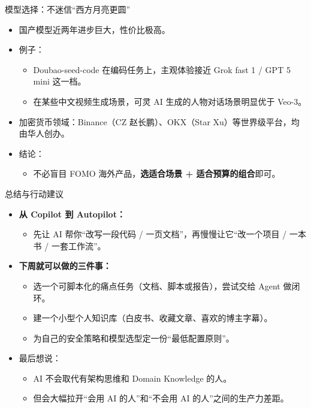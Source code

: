 \documentclass[aspectratio=169]{beamer}
\begin{document}
\begin{frame}{模型选择：不迷信“西方月亮更圆”}
  \begin{itemize}
    \item 国产模型近两年进步巨大，性价比极高。
    \item 例子：
      \begin{itemize}
        \item Doubao-seed-code 在编码任务上，主观体验接近 Grok fast 1 / GPT 5 mini 这一档。
        \item 在某些中文视频生成场景，可灵 AI 生成的人物对话场景明显优于 Veo-3。
      \end{itemize}
    \item 加密货币领域：Binance（CZ 赵长鹏）、OKX（Star Xu）等世界级平台，均由华人创办。
    \item 结论：
      \begin{itemize}
        \item 不必盲目 FOMO 海外产品，\textbf{选适合场景 + 适合预算的组合}即可。
      \end{itemize}
  \end{itemize}
\end{frame}

\begin{frame}{总结与行动建议}
  \begin{itemize}
    \item \textbf{从 Copilot 到 Autopilot：}
      \begin{itemize}
        \item 先让 AI 帮你“改写一段代码 / 一页文档”，再慢慢让它“改一个项目 / 一本书 / 一套工作流”。
      \end{itemize}
    \item \textbf{下周就可以做的三件事：}
      \begin{itemize}
        \item 选一个可脚本化的痛点任务（文档、脚本或报告），尝试交给 Agent 做闭环。
        \item 建一个小型个人知识库（白皮书、收藏文章、喜欢的博主字幕）。
        \item 为自己的安全策略和模型选型定一份“最低配置原则”。
      \end{itemize}
    \item 最后想说：
      \begin{itemize}
        \item AI 不会取代有架构思维和 Domain Knowledge 的人。
        \item 但会大幅拉开“会用 AI 的人”和“不会用 AI 的人”之间的生产力差距。
      \end{itemize}
  \end{itemize}
\end{frame}
\end{document}
